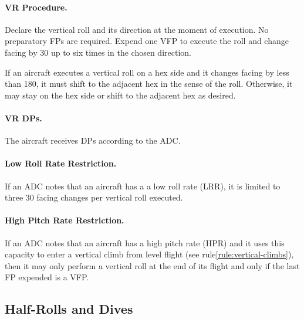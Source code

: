 {\paragraph{VR Procedure.} Declare the vertical roll and its direction at the moment of execution. No preparatory FPs are required. Expend one VFP to execute the roll and change facing by 30{\deg} up to six times in the chosen direction. 

If an aircraft executes a vertical roll on a hex side and it changes facing by less than 180{\deg}, it must shift to the adjacent hex in the sense of the roll. Otherwise, it may stay on the hex side or shift to the adjacent hex as desired.

\paragraph{VR DPs.} The aircraft receives DPs according to the ADC. 

\paragraph{Low Roll Rate Restriction.} If an ADC notes that an aircraft has a
a low roll rate (LRR), it is limited to three 30{\deg} facing changes per vertical roll executed.

\paragraph{High Pitch Rate Restriction.} If an ADC notes that an aircraft has a high pitch rate (HPR) and it uses this capacity to enter a vertical climb from level flight (see rule\ref{rule:vertical-climbs}), then it may only perform a vertical roll at the end of its flight and only if the last FP expended is a VFP.
}
\subsection{Half-Rolls and Dives}
\label{rule:half-rolls-and-dives}


